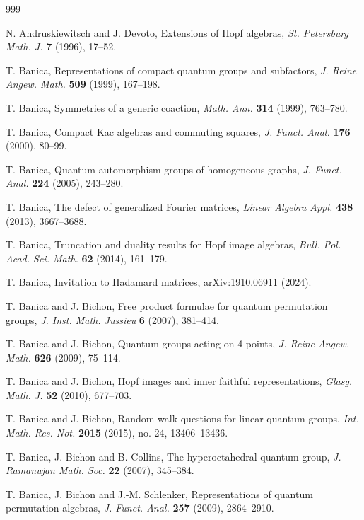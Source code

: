 \documentclass[11pt]{amsart}
\newcommand{\arx}[1]{{\hypersetup{allcolors=black}\href{https://arxiv.org/pdf/#1}{arXiv:#1}}}
\begin{document}
\begin{thebibliography}{999}
\setlength{\itemsep}{0pt plus 1pt}
\raggedright\hypersetup{urlcolor=black,linkcolor=black,citecolor=black}

 N. Andruskiewitsch and J. Devoto, Extensions of Hopf algebras, {\em St. Petersburg Math. J.} {\bf 7} (1996), 17--52.

 T. Banica, Representations of compact quantum groups and subfactors, {\em J. Reine Angew. Math.} {\bf 509} (1999), 167--198.

 T. Banica, Symmetries of a generic coaction, {\em Math. Ann.} {\bf 314} (1999), 763--780.

 T. Banica, Compact Kac algebras and commuting squares, {\em J. Funct. Anal.} {\bf 176} (2000), 80--99.

 T. Banica, Quantum automorphism groups of homogeneous graphs, {\em J. Funct. Anal.} {\bf 224} (2005), 243--280.

 T. Banica, The defect of generalized Fourier matrices, {\em Linear Algebra Appl.} {\bf 438} (2013), 3667--3688.

 T. Banica, Truncation and duality results for Hopf image algebras, {\em Bull. Pol. Acad. Sci. Math.} {\bf 62} (2014), 161--179.

 T. Banica, Invitation to Hadamard matrices, \arx{1910.06911} (2024).

 T. Banica and J. Bichon, Free product formulae for quantum permutation groups, {\em J. Inst. Math. Jussieu} {\bf 6} (2007), 381--414.

 T. Banica and J. Bichon, Quantum groups acting on 4 points, {\em J. Reine Angew. Math.} {\bf 626} (2009), 75--114.

 T. Banica and J. Bichon, Hopf images and inner faithful representations, {\em Glasg. Math. J.} {\bf 52} (2010), 677--703.

 T. Banica and J. Bichon, Random walk questions for linear quantum groups, {\em Int. Math. Res. Not.} {\bf 2015} (2015), no. 24, 13406--13436.

 T. Banica, J. Bichon and B. Collins, The hyperoctahedral quantum group, {\em J. Ramanujan Math. Soc.} {\bf 22} (2007), 345--384.

 T. Banica, J. Bichon and J.-M. Schlenker, Representations of quantum permutation algebras, {\em J. Funct. Anal.} {\bf 257} (2009), 2864--2910.


\end{thebibliography}
\end{document}
